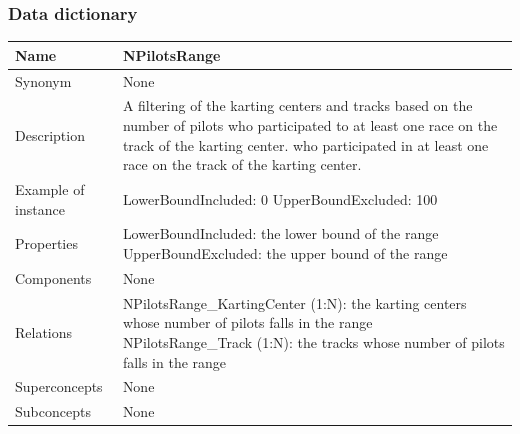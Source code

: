 \documentclass{beamer}
\begin{document}
\begin{frame}
    \frametitle{Data dictionary}
    \begin{table}
    \tiny
    \begin{tabular}{|p{2cm}|p{6cm}|}
    \hline
    Name & \textbf{NPilotsRange} \\
    \hline
    Synonym & None \\
    \hline
    Description & A filtering of the karting centers and tracks based on the number of 
    pilots who participated to at least one race on the track of the karting center. 
    who participated in at least one race on the track of the karting center. \\
    \hline
    Example of instance &
    LowerBoundIncluded: 0 \newline
    UpperBoundExcluded: 100 \\
    \hline
    Properties &
    LowerBoundIncluded: the lower bound of the range \newline
    UpperBoundExcluded: the upper bound of the range \\
    \hline
    Components & None \\
    \hline
    Relations &
    NPilotsRange\_KartingCenter (1:N): the karting centers whose number of pilots falls in the range \newline
    NPilotsRange\_Track (1:N): the tracks whose number of pilots falls in the range \\
    \hline
    Superconcepts & None \\
    \hline
    Subconcepts & None \\
    \hline
    \end{tabular}
    \end{table}
\end{frame}
\end{document}
